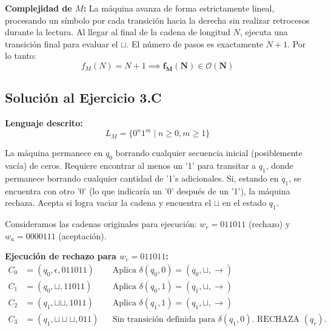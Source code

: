 \textbf{Complejidad de $M$:} La máquina avanza de forma estrictamente lineal, procesando un símbolo por cada transición hacia la derecha sin realizar retrocesos durante la lectura. Al llegar al final de la cadena de longitud $N$, ejecuta una transición final para evaluar el $\sqcup$. El número de pasos es exactamente $N + 1$. Por lo tanto:
\[ f_M(N) = N + 1 \implies \mathbf{f_M(N) \in \mathcal{O}(N)} \]


\subsection{Solución al Ejercicio 3.C}

\textbf{Lenguaje descrito:}
\[ L_M = \{0^n 1^m \mid n \geq 0, m \geq 1\} \]

La máquina permanece en $q_0$ borrando cualquier secuencia inicial (posiblemente vacía) de ceros. Requiere encontrar al menos un '1' para transitar a $q_1$, donde permanece borrando cualquier cantidad de '1's adicionales. Si, estando en $q_1$, se encuentra con otro '0' (lo que indicaría un '0' después de un '1'), la máquina rechaza. Acepta si logra vaciar la cadena y encuentra el $\sqcup$ en el estado $q_1$.

Consideramos las cadenas originales para ejecución:
$w_r = 011011$ (rechazo) y $w_a = 0000111$ (aceptación).

\vspace{0.3cm}
\noindent\textbf{Ejecución de rechazo para $w_r = 011011$:}
\begin{align*}
    C_0 &= (q_0, \epsilon, 011011) && \text{Aplica } \delta(q_0, 0) = (q_0, \sqcup, \to) \\
    C_1 &= (q_0, \sqcup, 11011) && \text{Aplica } \delta(q_0, 1) = (q_1, \sqcup, \to) \\
    C_2 &= (q_1, \sqcup\sqcup, 1011) && \text{Aplica } \delta(q_1, 1) = (q_1, \sqcup, \to) \\
    C_3 &= (q_1, \sqcup\sqcup\sqcup, 011) && \text{Sin transición definida para } \delta(q_1, 0). \text{ RECHAZA } (q_r).
\end{align*}

